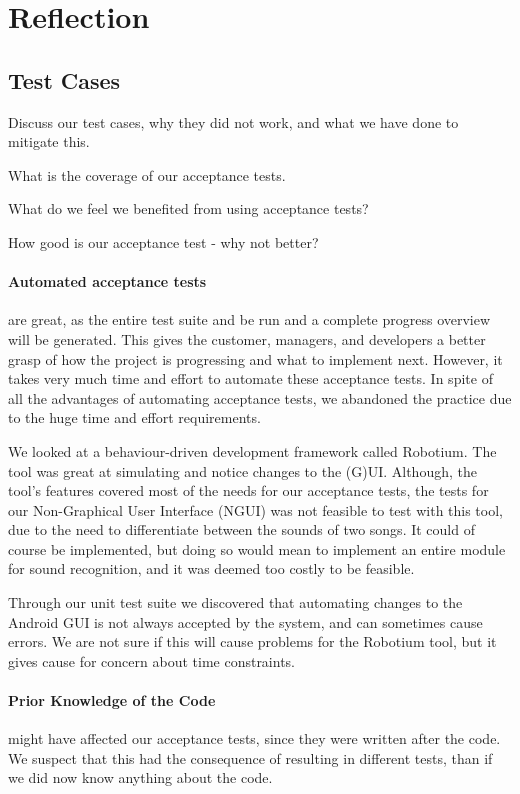 \section{Reflection}
\subsection{Test Cases}
Discuss our test cases, why they did not work, and what we have done to mitigate this.

What is the coverage of our acceptance tests.

What do we feel we benefited from using acceptance tests?

How good is our acceptance test - why not better?

\paragraph{Automated acceptance tests} are great, as the entire test suite and be run and a complete progress overview will be generated.
This gives the customer, managers, and developers a better grasp of how the project is progressing and what to implement next.
However, it takes very much time and effort to automate these acceptance tests.
In spite of all the advantages of automating acceptance tests, we abandoned the practice due to the huge time and effort requirements.

We looked at a behaviour-driven development framework called Robotium.
The tool was great at simulating and notice changes to the (G)UI.
Although, the tool's features covered most of the needs for our acceptance tests, the tests for our Non-Graphical User Interface (NGUI) was not feasible to test with this tool, due to the need to differentiate between the sounds of two songs.
It could of course be implemented, but doing so would mean to implement an entire module for sound recognition, and it was deemed too costly to be feasible. 

Through our unit test suite we discovered that automating changes to the Android GUI is not always accepted by the system, and can sometimes cause errors.
We are not sure if this will cause problems for the Robotium tool, but it gives cause for concern about time constraints.





\paragraph{Prior Knowledge of the Code} might have affected our acceptance tests, since they were written after the code. We suspect that this had the consequence of resulting in different tests, than if we did now know anything about the code. 

